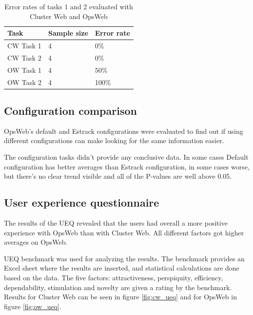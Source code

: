 \begin{table}[!ht]
\def\arraystretch{1.1}%
    \begin{center}
    \caption{Error rates of tasks 1 and 2 evaluated with Cluster Web and OpsWeb}
    \label{cw_ow_errors}
    \begin{tabular}{| l | l | l | }
    \hline
    Task & Sample size & Error rate  \\
    \hline
    CW Task 1    &  4 & 0\%       \\
    CW Task 2    &  4 & 0\%       \\
    OW Task 1    &  4 & 50\%       \\
    OW Task 2    &  4 & 100\%       \\
    \hline
    \end{tabular}
    \end{center}
\end{table}

\subsection{Configuration comparison}
OpsWeb's default and Estrack configurations were evaluated to find out if using different configurations can make looking for the same information easier.

The configuration tasks didn't provide any conclusive data. In some cases Default configuration has better averages than Estrack configuration, in some cases worse, but there's no clear trend visible and all of the P-values are well above 0.05.

\subsection{User experience questionnaire}
The results of the UEQ revealed that the users had overall a more positive experience with OpsWeb than with Cluster Web. All different factors got higher averages on OpsWeb.

UEQ benchmark was used for analyzing the results. \cite{schrepp2017construction} The benchmark provides an Excel sheet where the results are inserted, and statistical calculations are done based on the data. The five factors: attractiveness, perspiquity, efficiency, dependability, stimulation and novelty are given a rating by the benchmark. Results for Cluster Web can be seen in figure \ref{fig:cw_ueq} and for OpsWeb in figure \ref{fig:ow_ueq}.

